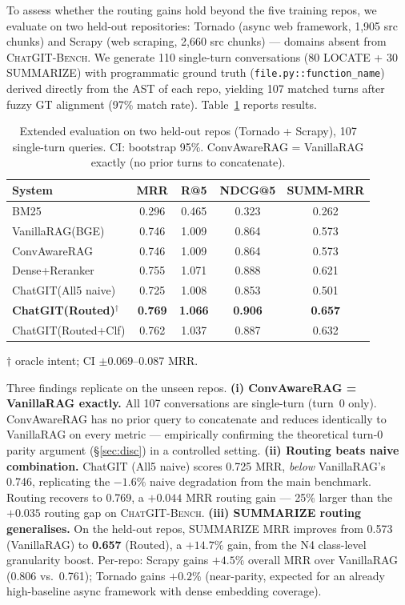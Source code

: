 \documentclass[runningheads]{llncs}
\newcommand{\conv}{\textsc{ChatGIT-Bench}\xspace}
\begin{document}
To assess whether the routing gains hold beyond the five training
repos, we evaluate on two held-out repositories: Tornado (async web
framework, 1,905 src chunks) and Scrapy (web scraping, 2,660 src
chunks) --- domains absent from \conv. We generate 110 single-turn
conversations (80 LOCATE + 30 SUMMARIZE) with programmatic ground
truth (\texttt{file.py::function\_name}) derived directly from the
AST of each repo, yielding 107 matched turns after fuzzy GT alignment
(97\% match rate). Table~\ref{tab:extended} reports results.

\begin{table}[t]
\centering
\footnotesize
\caption{Extended evaluation on two held-out repos (Tornado + Scrapy),
  107 single-turn queries. CI: bootstrap 95\%.
  ConvAwareRAG = VanillaRAG exactly (no prior turns to concatenate).}
\label{tab:extended}
\begin{tabular}{lcccc}
\toprule
System & MRR & R@5 & NDCG@5 & SUMM-MRR \\
\midrule
BM25                 & 0.296 & 0.465 & 0.323 & 0.262 \\
VanillaRAG(BGE)      & 0.746 & 1.009 & 0.864 & 0.573 \\
ConvAwareRAG         & 0.746 & 1.009 & 0.864 & 0.573 \\
Dense+Reranker       & 0.755 & 1.071 & 0.888 & 0.621 \\
ChatGIT(All5 naive)  & 0.725 & 1.008 & 0.853 & 0.501 \\
\textbf{ChatGIT(Routed)}$^\dagger$ & \textbf{0.769} & \textbf{1.066} & \textbf{0.906} & \textbf{0.657} \\
ChatGIT(Routed+Clf)  & 0.762 & 1.037 & 0.887 & 0.632 \\
\bottomrule
\end{tabular}
\footnotesize{$\dagger$ oracle intent; CI $\pm$0.069--0.087 MRR.}
\end{table}

Three findings replicate on the unseen repos.
\textbf{(i) ConvAwareRAG = VanillaRAG exactly.}
All 107 conversations are single-turn (turn~0 only). ConvAwareRAG
has no prior query to concatenate and reduces identically to
VanillaRAG on every metric --- empirically confirming the theoretical
turn-0 parity argument (\S\ref{sec:disc}) in a controlled setting.
\textbf{(ii) Routing beats naive combination.}
ChatGIT (All5 naive) scores 0.725 MRR, \emph{below} VanillaRAG's
0.746, replicating the $-1.6\%$ naive degradation from the main
benchmark. Routing recovers to 0.769, a $+0.044$ MRR routing gain
--- 25\% larger than the $+0.035$ routing gap on \conv.
\textbf{(iii) SUMMARIZE routing generalises.}
On the held-out repos, SUMMARIZE MRR improves from 0.573
(VanillaRAG) to \textbf{0.657} (Routed), a $+14.7\%$ gain, from
the N4 class-level granularity boost. Per-repo: Scrapy gains
$+4.5\%$ overall MRR over VanillaRAG (0.806 vs.\ 0.761);
Tornado gains $+0.2\%$ (near-parity, expected for an already
high-baseline async framework with dense embedding coverage).
\end{document}
